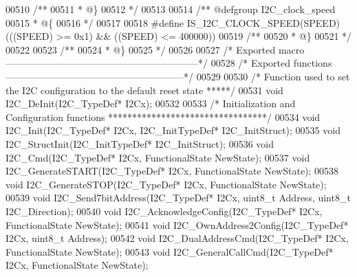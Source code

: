\begin{DoxyCode}
00510 \textcolor{comment}{/**}
00511 \textcolor{comment}{  * @\}}
00512 \textcolor{comment}{  */}
00513 
00514 \textcolor{comment}{/** @defgroup I2C\_clock\_speed }
00515 \textcolor{comment}{  * @\{}
00516 \textcolor{comment}{  */}
00517 
00518 \textcolor{preprocessor}{#}\textcolor{preprocessor}{define} \textcolor{preprocessor}{IS\_I2C\_CLOCK\_SPEED}\textcolor{preprocessor}{(}\textcolor{preprocessor}{SPEED}\textcolor{preprocessor}{)} \textcolor{preprocessor}{(}\textcolor{preprocessor}{(}\textcolor{preprocessor}{(}\textcolor{preprocessor}{SPEED}\textcolor{preprocessor}{)} \textcolor{preprocessor}{>=} 0x1\textcolor{preprocessor}{)} \textcolor{preprocessor}{&&} \textcolor{preprocessor}{(}\textcolor{preprocessor}{(}\textcolor{preprocessor}{SPEED}\textcolor{preprocessor}{)} \textcolor{preprocessor}{<=} 400000\textcolor{preprocessor}{)}\textcolor{preprocessor}{)}
00519 \textcolor{comment}{/**}
00520 \textcolor{comment}{  * @\}}
00521 \textcolor{comment}{  */}
00522 
00523 \textcolor{comment}{/**}
00524 \textcolor{comment}{  * @\}}
00525 \textcolor{comment}{  */}
00526 
00527 \textcolor{comment}{/* Exported macro ------------------------------------------------------------*/}
00528 \textcolor{comment}{/* Exported functions --------------------------------------------------------*/}
00529 
00530 \textcolor{comment}{/*  Function used to set the I2C configuration to the default reset state *****/}
00531 \textcolor{keywordtype}{void} I2C_DeInit(I2C\_TypeDef* I2Cx);
00532 
00533 \textcolor{comment}{/* Initialization and Configuration functions *********************************/}
00534 \textcolor{keywordtype}{void} I2C_Init(I2C\_TypeDef* I2Cx, I2C\_InitTypeDef* I2C\_InitStruct);
00535 \textcolor{keywordtype}{void} I2C_StructInit(I2C\_InitTypeDef* I2C\_InitStruct);
00536 \textcolor{keywordtype}{void} I2C_Cmd(I2C\_TypeDef* I2Cx, FunctionalState NewState);
00537 \textcolor{keywordtype}{void} I2C_GenerateSTART(I2C\_TypeDef* I2Cx, FunctionalState NewState);
00538 \textcolor{keywordtype}{void} I2C_GenerateSTOP(I2C\_TypeDef* I2Cx, FunctionalState NewState);
00539 \textcolor{keywordtype}{void} I2C_Send7bitAddress(I2C\_TypeDef* I2Cx, uint8\_t Address, uint8\_t I2C\_Direction);
00540 \textcolor{keywordtype}{void} I2C_AcknowledgeConfig(I2C\_TypeDef* I2Cx, FunctionalState NewState);
00541 \textcolor{keywordtype}{void} I2C_OwnAddress2Config(I2C\_TypeDef* I2Cx, uint8\_t Address);
00542 \textcolor{keywordtype}{void} I2C_DualAddressCmd(I2C\_TypeDef* I2Cx, FunctionalState NewState);
00543 \textcolor{keywordtype}{void} I2C_GeneralCallCmd(I2C\_TypeDef* I2Cx, FunctionalState NewState);

\end{DoxyCode}
